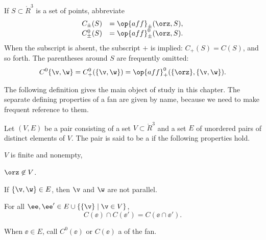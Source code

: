 

If $S\subset\ring{R}^3$ is a set of points,
abbreviate
\begin{displaymath}
\begin{array}{lll}
C_\pm(S) &= \op{aff}_\pm(\orz,S),\\
C^0_\pm(S) &= \op{aff}^0_\pm(\orz,S).\\
\end{array}
\end{displaymath}
When the subscript is absent, the subscript $+$ is implied: $C_+(S)
= C(S)$, and so forth.  The parentheses around $S$ are frequently
omitted:
\begin{displaymath}C^0\{\v,\w\}=C^0_+(\{\v,\w\}) =
\op{aff}^0_+(\{\orz\},\{\v,\w\}).\end{displaymath}

The following definition gives the main object of study in this chapter.  The separate
defining properties of a fan are given by name, because we need to make frequent
reference to them.

\begin{definition}
Let $(V,E)$ be a pair consisting of a set $V\subset \ring{R}^3$ and
a set $E$ of unordered pairs of distinct elements of $V$.  The pair
is said to be a  if the following properties hold.
\begin{description}
\item {} $V$ is finite and  nonempty,
\item {} $\orz\not\in V$.
\item {} If $\{\v,\w\} \in E$, then $\v$ and $\w$
are not parallel.
\item {}
For all $\ee ,\ee '\in E \cup \{\{\v\}\mid \v\in V\}$, 
\begin{displaymath}C(\ee )\cap C(\ee ') = C(\ee \cap \ee
').\end{displaymath}
\end{description}
When $\ee\in E$, call $C^0(\ee)$ or $C(\ee)$ a 
of the fan.
\end{definition}
%
%
%
%
%
%


